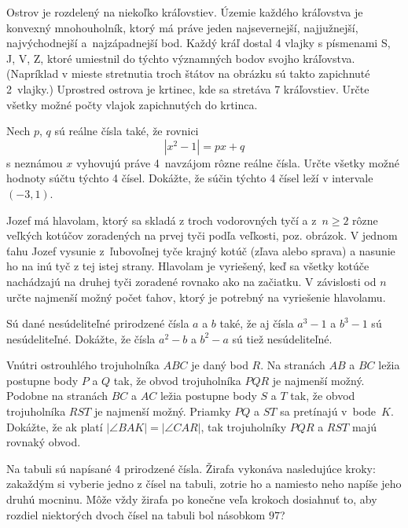 {%
Ostrov je rozdelený na niekoľko kráľovstiev. Územie každého kráľovstva je konvexný mnohouholník, ktorý má práve jeden najsevernejší, najjužnejší, najvýchodnejší a~najzápadnejší bod. Každý kráľ dostal 4 vlajky s písmenami S, J, V, Z, ktoré umiestnil do týchto významných bodov svojho kráľovstva. (Napríklad v mieste stretnutia troch štátov na obrázku sú takto zapichnuté 2~vlajky.) Uprostred ostrova je krtinec, kde sa stretáva 7 kráľovstiev. Určte všetky možné počty vlajok zapichnutých do krtinca. %
}

{%
Nech $p$, $q$ sú reálne čísla také, že rovnici
$$
|x^2-1|=px+q
$$
s neznámou $x$ vyhovujú práve 4~navzájom rôzne reálne čísla.
 Určte všetky možné hodnoty súčtu týchto 4 čísel.
 Dokážte, že súčin týchto 4 čísel leží v intervale $(-3,1)$.
}

{%
Jozef má hlavolam, ktorý sa skladá z troch vodorovných tyčí a z~$n\ge2$ rôzne veľkých kotúčov zoradených na prvej tyči podľa veľkosti, poz. obrázok. V jednom ťahu Jozef vysunie z~ľubovoľnej tyče krajný kotúč (zľava alebo sprava) a nasunie ho na inú tyč z tej istej strany. Hlavolam je vyriešený, keď sa všetky kotúče nachádzajú na druhej tyči zoradené rovnako ako na začiatku. V závislosti od $n$ určte najmenší možný počet ťahov, ktorý je potrebný na vyriešenie hlavolamu.
%
}

{%
Sú dané nesúdeliteľné prirodzené čísla $a$ a $b$ také, že aj čísla $a^3-1$ a $b^3-1$ sú nesúdeliteľné. Dokážte, že čísla $a^2-b$ a $b^2-a$ sú tiež nesúdeliteľné.
}

{%
Vnútri ostrouhlého trojuholníka $ABC$ je daný bod $R$. Na stranách $AB$ a $BC$ ležia postupne body $P$ a $Q$ tak, že obvod trojuholníka $PQR$ je najmenší možný. Podobne na stranách $BC$ a $AC$ ležia postupne body $S$ a $T$ tak, že obvod trojuholníka $RST$ je najmenší možný. Priamky $PQ$ a $ST$ sa pretínajú v~bode~$K$. Dokážte, že ak platí $|\angle BAK| = |\angle CAR|$, tak trojuholníky $PQR$ a $RST$ majú rovnaký obvod.
}

{%
Na tabuli sú napísané 4 prirodzené čísla. Žirafa vykonáva nasledujúce kroky: zakaždým si vyberie jedno z čísel na tabuli, zotrie ho a namiesto neho napíše jeho druhú mocninu. Môže vždy žirafa po konečne veľa krokoch dosiahnuť to, aby rozdiel niektorých dvoch čísel na tabuli bol násobkom $97$?
}

